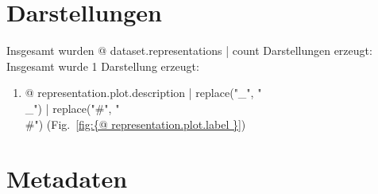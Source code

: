 



\section{Darstellungen}

Insgesamt wurden {@ dataset.representations | count } Darstellungen erzeugt:
Insgesamt wurde 1 Darstellung erzeugt:

\begin{enumerate}
\item {@ representation.plot.description | replace("_", "\\_") | replace("#", "\\#") } (Fig.~\ref{fig:{@ representation.plot.label }})
\end{enumerate}




\clearpage


\section{Metadaten}




